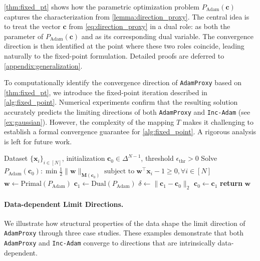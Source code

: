 \documentclass{article} %
\theoremstyle{plain}
\theoremstyle{definition}
\theoremstyle{remark}
\def\bx{{\mathbf x}}
\def\bc{{\mathbf c}}
\def\bw{{\mathbf w}}
\def\bM{{\mathbf M}}
\begin{document}
\cref{thm:fixed_pt} shows how the parametric optimization problem $P_{\text{Adam}}(\bc)$ captures the characterization from \cref{lemma:direction_proxy}. The central idea is to treat the vector $\bc$ from \cref{eq:direction_proxy} in a dual role: as both the parameter of $P_{\text{Adam}}(\bc)$ and as its corresponding dual variable. The convergence direction is then identified at the point where these two roles coincide, leading naturally to the fixed-point formulation. Detailed proofs are deferred to \cref{appendix:generalization}.

To computationally identify the convergence direction of \texttt{AdamProxy} based on \cref{thm:fixed_pt}, we introduce the fixed-point iteration described in \cref{alg:fixed_point}. Numerical experiments confirm that the resulting solution accurately predicts the limiting directions of both \texttt{AdamProxy} and \texttt{Inc-Adam} (see \cref{ex:gaussian}). However, the complexity of the mapping $T$ makes it challenging to establish a formal convergence guarantee for \cref{alg:fixed_point}. A rigorous analysis is left for future work.

\begin{algorithm}[t]
        \caption{Fixed-Point Iteration}
        \label{alg:fixed_point}
        \begin{algorithmic}[1]
        \renewcommand{\algorithmicensure}{\textbf{Input:}}
        \ENSURE Dataset $\{\bx_i\}_{i \in [N]}$, initialization $\bc_0 \in \Delta^{N-1}$, threshold $\epsilon_{\text{thr}}>0$
        \REPEAT
            \STATE Solve $P_{\text{Adam}}(\bc_0): \min \frac{1}{2}\|\bw\|_{\bM(\bc_0)} \; \text{subject to} \; \bw^\top\bx_i-1\geq0, \forall i\in[N]$
            \STATE $\bw \leftarrow \text{Primal}(P_{\text{Adam}})$
            \STATE $\bc_1 \leftarrow \text{Dual}(P_{\text{Adam}})$
            \STATE $\delta \leftarrow \|\bc_1 - \bc_0\|_2$
            \STATE $\bc_0 \leftarrow \bc_1$
        \STATE \textbf{return} $\bw$
        \end{algorithmic}
\end{algorithm}

\vspace{-3pt}
\paragraph{Data-dependent Limit Directions.}
We illustrate how structural properties of the data shape the limit direction of \texttt{AdamProxy} through three case studies. These examples demonstrate that both \texttt{AdamProxy} and \texttt{Inc-Adam} converge to directions that are intrinsically data-dependent.
\end{document}
